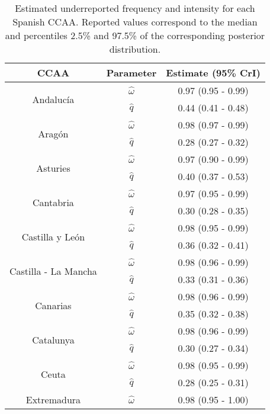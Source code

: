 \documentclass{bmcart}
\begin{document}
\begin{backmatter}
\begin{table}[h]
\small\sf\centering
\caption{Estimated underreported frequency and intensity for each Spanish CCAA. Reported values correspond to the median and percentiles 2.5\% and 97.5\% of the corresponding posterior distribution.\label{tab:ccaa_est}}
\begin{tabular}{ccc}
\hline
CCAA & Parameter & Estimate (95\% CrI)\\
\hline
\multirow{2}{*}{Andaluc\'ia}  & $\hat{\omega}$  & 0.97 (0.95 - 0.99) \\
                              & $\hat{q}$       & 0.44 (0.41 - 0.48) \\
\hline
\multirow{2}{*}{Arag\'on}    & $\hat{\omega}$  & 0.98 (0.97 - 0.99) \\
                             & $\hat{q}$       & 0.28 (0.27 - 0.32) \\
\hline
\multirow{2}{*}{Asturies}    & $\hat{\omega}$  & 0.97 (0.90 - 0.99) \\
                             & $\hat{q}$       & 0.40 (0.37 - 0.53) \\
\hline
\multirow{2}{*}{Cantabria}    & $\hat{\omega}$  & 0.97 (0.95 - 0.99) \\
                              & $\hat{q}$       & 0.30 (0.28 - 0.35) \\
\hline
\multirow{2}{*}{Castilla y Le\'on}    & $\hat{\omega}$  & 0.98 (0.95 - 0.99) \\
                                      & $\hat{q}$       & 0.36 (0.32 - 0.41) \\
\hline
\multirow{2}{*}{Castilla - La Mancha}    & $\hat{\omega}$  & 0.98 (0.96 - 0.99) \\
                                         & $\hat{q}$       & 0.33 (0.31 - 0.36) \\
\hline
\multirow{2}{*}{Canarias}    & $\hat{\omega}$  & 0.98 (0.96 - 0.99) \\
                             & $\hat{q}$       & 0.35 (0.32 - 0.38) \\
\hline
\multirow{2}{*}{Catalunya}    & $\hat{\omega}$  & 0.98 (0.96 - 0.99) \\
                              & $\hat{q}$       & 0.30 (0.27 - 0.34) \\
\hline
\multirow{2}{*}{Ceuta}    & $\hat{\omega}$  & 0.98 (0.95 - 0.99) \\
                          & $\hat{q}$       & 0.28 (0.25 - 0.31) \\
\hline
\multirow{2}{*}{Extremadura}    & $\hat{\omega}$  & 0.98 (0.95 - 1.00) \\

\end{tabular}
\end{table}
\end{backmatter}
\end{document}
